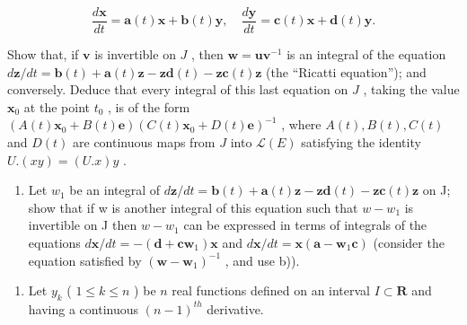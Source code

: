 \[
\frac {d \mathbf {x}}{d t} = \mathbf {a} (t) \mathbf {x} + \mathbf {b} (t) \mathbf {y}, \quad \frac {d \mathbf {y}}{d t} = \mathbf {c} (t) \mathbf {x} + \mathbf {d} (t) \mathbf {y}.
\]

Show that, if \(\mathbf{v}\) is invertible on \(J\) , then \(\mathbf{w} = \mathbf{u}\mathbf{v}^{-1}\) is an integral of the equation \(d\mathbf{z}/dt = \mathbf{b}(t) + \mathbf{a}(t)\mathbf{z} - \mathbf{z}\mathbf{d}(t) - \mathbf{z}\mathbf{c}(t)\mathbf{z}\) (the ``Ricatti equation''); and conversely. Deduce that every integral of this last equation on \(J\) , taking the value \(\mathbf{x}_0\) at the point \(t_0\) , is of the form \((A(t)\mathbf{x}_0 + B(t)\mathbf{e})(C(t)\mathbf{x}_0 + D(t)\mathbf{e})^{-1}\) , where \(A(t), B(t), C(t)\) and \(D(t)\) are continuous maps from \(J\) into \(\mathcal{L}(E)\) satisfying the identity \(U.(xy) = (U.x)y\) .

\begin{enumerate}
\def\labelenumi{\alph{enumi})}
\setcounter{enumi}{3}
\tightlist
\item
  Let \(w_{1}\) be an integral of \(d\mathbf{z}/dt = \mathbf{b}(t) + \mathbf{a}(t)\mathbf{z} - \mathbf{z}\mathbf{d}(t) - \mathbf{z}\mathbf{c}(t)\mathbf{z}\) on J; show that if w is another integral of this equation such that \(w - w_{1}\) is invertible on J then \(w - w_{1}\) can be expressed in terms of integrals of the equations \(d\mathbf{x}/dt = -(\mathbf{d} + \mathbf{c}\mathbf{w}_{1})\mathbf{x}\) and \(d\mathbf{x}/dt = \mathbf{x}(\mathbf{a} - \mathbf{w}_{1}\mathbf{c})\) (consider the equation satisfied by \((\mathbf{w} - \mathbf{w}_{1})^{-1}\) , and use b)).
\end{enumerate}

\begin{enumerate}
\def\labelenumi{\arabic{enumi})}
\setcounter{enumi}{8}
\tightlist
\item
  Let \(y_{k}\) ( \(1 \leqslant k \leqslant n\) ) be \(n\) real functions defined on an interval \(I \subset \mathbf{R}\) and having a continuous \((n - 1)^{th}\) derivative.
\end{enumerate}

